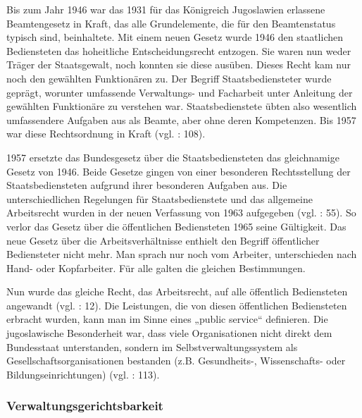 Bis zum Jahr 1946 war das 1931 für das Königreich Jugoslawien erlassene Beamtengesetz in Kraft, das alle Grundelemente, die für den Beamtenstatus typisch sind, beinhaltete. Mit einem neuen Gesetz wurde 1946 den staatlichen Bediensteten das hoheitliche Entscheidungsrecht entzogen. Sie waren nun weder Träger der Staatsgewalt, noch konnten sie diese ausüben. Dieses Recht kam nur noch den gewählten Funktionären zu. Der Begriff Staatsbediensteter wurde geprägt, worunter umfassende Verwaltungs- und Facharbeit unter Anleitung der gewählten Funktionäre zu verstehen war. Staatsbedienstete übten also wesentlich umfassendere Aufgaben aus als Beamte, aber ohne deren Kompetenzen. Bis 1957 war diese Rechtsordnung in Kraft (vgl. \cite{vavpetic} : 108).\par
1957 ersetzte das Bundesgesetz über die Staatsbediensteten das gleichnamige Gesetz von 1946. Beide Gesetze gingen von einer besonderen Rechtsstellung der Staatsbediensteten aufgrund ihrer besonderen Aufgaben aus. Die unterschiedlichen Regelungen für Staatsbedienstete und das allgemeine Arbeitsrecht wurden in der neuen Verfassung von 1963 aufgegeben (vgl. \cite{sevic} : 55). So verlor das Gesetz über die öffentlichen Bediensteten 1965 seine Gültigkeit. Das neue Gesetz über die Arbeitsverhältnisse enthielt den Begriff öffentlicher Bediensteter nicht mehr. Man sprach nur noch vom Arbeiter, unterschieden nach Hand- oder Kopfarbeiter. Für alle galten die gleichen Bestimmungen. \par
Nun wurde das gleiche Recht, das Arbeitsrecht, auf alle öffentlich Bediensteten angewandt (vgl. \cite{markic} : 12). Die Leistungen, die von diesen öffentlichen Bediensteten erbracht wurden, kann man im Sinne eines „public service“ definieren. Die jugoslawische Besonderheit war, dass viele Organisationen nicht direkt dem Bundesstaat unterstanden, sondern im Selbstverwaltungssystem als Gesellschaftsorganisationen bestanden (z.B. Gesundheits-, Wissenschafts- oder Bildungseinrichtungen) (vgl. \cite{vavpetic} : 113).

\subsubsection{Verwaltungsgerichtsbarkeit }

